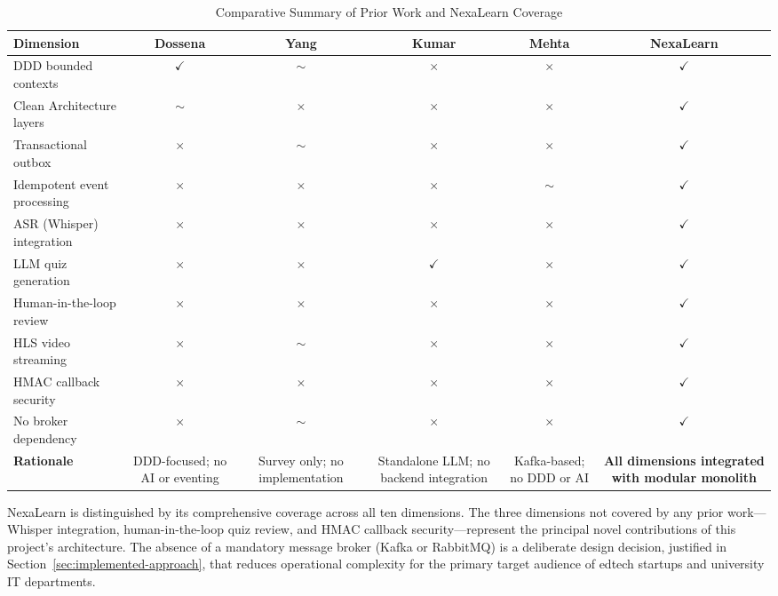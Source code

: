 \begin{table}[H]
  \centering
  \caption{Comparative Summary of Prior Work and NexaLearn Coverage}
  \label{tab:lit-comparison}
  \small
  \begin{tabularx}{\textwidth}{@{}X c c c c c@{}}
    \toprule
    \textbf{Dimension} &
    \textbf{Dossena} &
    \textbf{Yang} &
    \textbf{Kumar} &
    \textbf{Mehta} &
    \textbf{NexaLearn} \\
    \midrule
    DDD bounded contexts     & $\checkmark$ & $\sim$ & $\times$ & $\times$ & $\checkmark$ \\
    \addlinespace
    Clean Architecture layers & $\sim$ & $\times$ & $\times$ & $\times$ & $\checkmark$ \\
    \addlinespace
    Transactional outbox     & $\times$ & $\sim$ & $\times$ & $\times$ & $\checkmark$ \\
    \addlinespace
    Idempotent event processing & $\times$ & $\times$ & $\times$ & $\sim$ & $\checkmark$ \\
    \addlinespace
    ASR (Whisper) integration & $\times$ & $\times$ & $\times$ & $\times$ & $\checkmark$ \\
    \addlinespace
    LLM quiz generation      & $\times$ & $\times$ & $\checkmark$ & $\times$ & $\checkmark$ \\
    \addlinespace
    Human-in-the-loop review & $\times$ & $\times$ & $\times$ & $\times$ & $\checkmark$ \\
    \addlinespace
    HLS video streaming      & $\times$ & $\sim$ & $\times$ & $\times$ & $\checkmark$ \\
    \addlinespace
    HMAC callback security   & $\times$ & $\times$ & $\times$ & $\times$ & $\checkmark$ \\
    \addlinespace
    No broker dependency     & $\times$ & $\sim$ & $\times$ & $\times$ & $\checkmark$ \\
    \midrule
    \textbf{Rationale} &
    \parbox[t]{2.2cm}{\footnotesize DDD-focused; no AI or eventing} &
    \parbox[t]{2.2cm}{\footnotesize Survey only; no implementation} &
    \parbox[t]{2.2cm}{\footnotesize Standalone LLM; no backend integration} &
    \parbox[t]{2.2cm}{\footnotesize Kafka-based; no DDD or AI} &
    \parbox[t]{2.2cm}{\footnotesize \textbf{All dimensions integrated with modular monolith}} \\
    \bottomrule
  \end{tabularx}
\end{table}

NexaLearn is distinguished by its comprehensive coverage across all ten dimensions. The three dimensions not covered by any prior work---Whisper integration, human-in-the-loop quiz review, and HMAC callback security---represent the principal novel contributions of this project's architecture. The absence of a mandatory message broker (Kafka or RabbitMQ) is a deliberate design decision, justified in Section~\ref{sec:implemented-approach}, that reduces operational complexity for the primary target audience of edtech startups and university IT departments.

